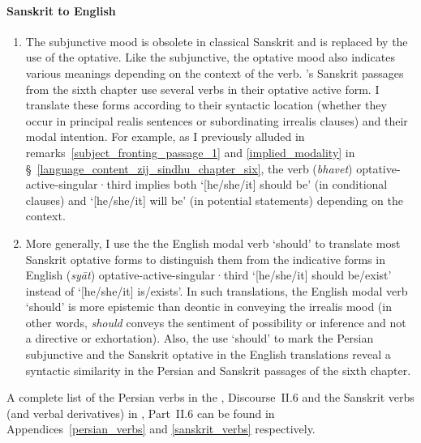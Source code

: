 \paragraph{Sanskrit to English} 
\begin{enumerate}[topsep=0pt]
\item The subjunctive mood is obsolete in classical Sanskrit and is replaced by the use of the  optative. Like the subjunctive, the optative mood also indicates various meanings depending on the context of the verb. \Nityananda's Sanskrit passages from the sixth chapter use several verbs in their optative active form. I translate these forms according to their syntactic location (\ie whether they occur in principal realis sentences or subordinating irrealis clauses) and their modal intention. For example, as I previously alluded in remarks~\ref{subject_fronting_passage_1} and \ref{implied_modality} in \S~\ref{language_content_zij_sindhu_chapter_six}, the verb  (\textit{bhavet}) \acrshort{optative}-\acrshort{active}-\acrshort{singular}·\acrshort{third} implies both `[he/she/it] should be' (in conditional clauses) and `[he/she/it] will be' (in potential statements) depending on the context. 

\item More generally, I use the the English modal verb `should' to translate most Sanskrit optative forms to distinguish them from the indicative forms in English \eg {} (\textit{syāt}) \acrshort{optative}-\acrshort{active}-\acrshort{singular}·\acrshort{third} `[he/she/it] should be/exist' instead of `[he/she/it] is/exists'. In such translations, the English modal verb `should' is more epistemic than deontic in conveying the irrealis mood (in other words, \textit{should} conveys the sentiment of possibility or inference and not a directive or exhortation). Also, the use `should' to mark the Persian subjunctive and the Sanskrit optative in the English translations reveal a syntactic similarity in the Persian and Sanskrit passages of the sixth chapter.
\end{enumerate}

A complete list of the Persian verbs in the \ZijiShahJahani, Discourse~II.6 and the Sanskrit verbs (and verbal derivatives) in \Siddhantasindhu, Part~II.6 can be found in Appendices~\ref{persian_verbs} and \ref{sanskrit_verbs} respectively.   
    

   